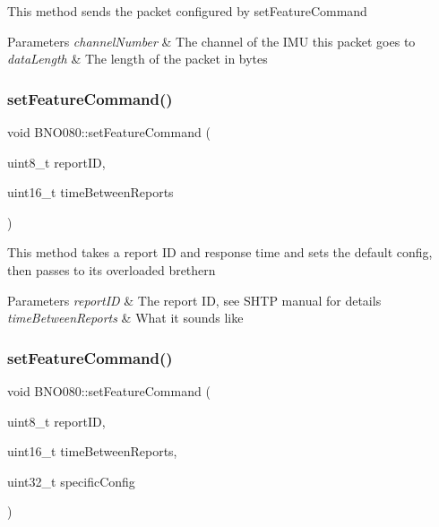 This method sends the packet configured by set\+Feature\+Command 
\begin{DoxyParams}{Parameters}
{\em channel\+Number} & The channel of the I\+MU this packet goes to \\
\hline
{\em data\+Length} & The length of the packet in bytes \\
\hline
\end{DoxyParams}
\mbox{\label{classBNO080_ad8ee71b985377d624e34dda56516ec97}} 
\subsubsection{\texorpdfstring{setFeatureCommand()}{setFeatureCommand()}\hspace{0.1cm}{\footnotesize\ttfamily [1/2]}}
{\footnotesize\ttfamily void B\+N\+O080\+::set\+Feature\+Command (\begin{DoxyParamCaption}\item[{uint8\+\_\+t}]{report\+ID,  }\item[{uint16\+\_\+t}]{time\+Between\+Reports }\end{DoxyParamCaption})}

This method takes a report ID and response time and sets the default config, then passes to it\textquotesingle{}s overloaded brethern 
\begin{DoxyParams}{Parameters}
{\em report\+ID} & The report ID, see S\+H\+TP manual for details \\
\hline
{\em time\+Between\+Reports} & What it sounds like \\
\hline
\end{DoxyParams}
\mbox{\label{classBNO080_ac6c46a2c3e28f36b47123c761186e74d}} 
\subsubsection{\texorpdfstring{setFeatureCommand()}{setFeatureCommand()}\hspace{0.1cm}{\footnotesize\ttfamily [2/2]}}
{\footnotesize\ttfamily void B\+N\+O080\+::set\+Feature\+Command (\begin{DoxyParamCaption}\item[{uint8\+\_\+t}]{report\+ID,  }\item[{uint16\+\_\+t}]{time\+Between\+Reports,  }\item[{uint32\+\_\+t}]{specific\+Config }\end{DoxyParamCaption})}

